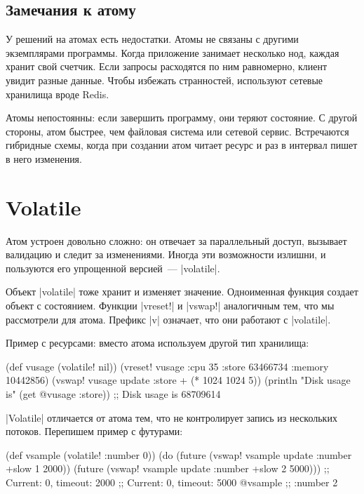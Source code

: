 \subsection{Замечания к атому}

У решений на атомах есть недостатки. Атомы не связаны с другими экземплярами
программы. Когда приложение занимает несколько нод, каждая хранит свой
счетчик. Если запросы расходятся по ним равномерно, клиент увидит разные
данные. Чтобы избежать странностей, используют сетевые хранилища вроде Redis.

Атомы непостоянны: если завершить программу, они теряют состояние. С другой
стороны, атом быстрее, чем файловая система или сетевой сервис. Встречаются
гибридные схемы, когда при создании атом читает ресурс и раз в интервал пишет в
него изменения.

\section{Volatile}

Атом устроен довольно сложно: он отвечает за параллельный доступ, вызывает
валидацию и следит за изменениями. Иногда эти возможности излишни, и пользуются
его упрощенной версией~--- \spverb|volatile|.

Объект \spverb|volatile| тоже хранит и изменяет значение. Одноименная функция
создает объект с состоянием. Функции \spverb|vreset!| и \spverb|vswap!|
аналогичным тем, что мы рассмотрели для атома. Префикс \spverb|v| означает, что
они работают с \spverb|volatile|.

Пример с ресурсами: вместо атома используем другой тип хранилища:

\begin{english}
  \begin{clojure}
(def vusage (volatile! nil))
(vreset! vusage
         {:cpu 35
          :store 63466734
          :memory 10442856})
(vswap! vusage update :store + (* 1024 1024 5))
(println "Disk usage is" (get @vusage :store))
;; Disk usage is 68709614
  \end{clojure}
\end{english}

\spverb|Volatile| отличается от атома тем, что не контролирует запись из
нескольких потоков. Перепишем пример с футурами:

\begin{english}
  \begin{clojure}
(def vsample (volatile! {:number 0}))
(do (future (vswap! vsample update :number +slow 1 2000))
    (future (vswap! vsample update :number +slow 2 5000)))
;; Current: 0, timeout: 2000
;; Current: 0, timeout: 5000
@vsample ;; {:number 2}
  \end{clojure}
\end{english}

